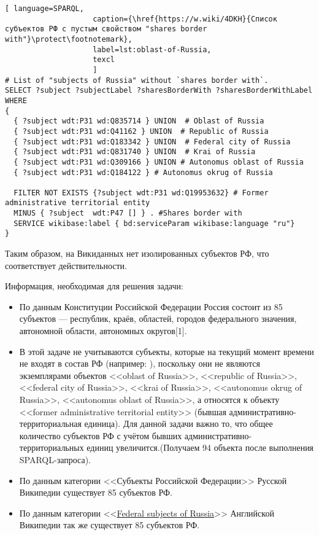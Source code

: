 \begin{lstlisting}[ language=SPARQL, 
                    caption={\href{https://w.wiki/4DKH}{Список субъектов РФ с пустым свойством "shares border with"}\protect\footnotemark},
                    label=lst:oblast-of-Russia,
                    texcl 
                    ]
# List of "subjects of Russia" without `shares border with`. 
SELECT ?subject ?subjectLabel ?sharesBorderWith ?sharesBorderWithLabel
WHERE
{
  { ?subject wdt:P31 wd:Q835714 } UNION  # Oblast of Russia
  { ?subject wdt:P31 wd:Q41162 } UNION  # Republic of Russia
  { ?subject wdt:P31 wd:Q183342 } UNION  # Federal city of Russia
  { ?subject wdt:P31 wd:Q831740 } UNION  # Krai of Russia
  { ?subject wdt:P31 wd:Q309166 } UNION # Autonomus oblast of Russia
  { ?subject wdt:P31 wd:Q184122 } # Autonomus okrug of Russia
  
  FILTER NOT EXISTS {?subject wdt:P31 wd:Q19953632} # Former administrative territorial entity
  MINUS { ?subject  wdt:P47 [] } . #Shares border with 
  SERVICE wikibase:label { bd:serviceParam wikibase:language "ru"}
}
\end{lstlisting}%

Таким образом, на Викиданных нет изолированных субъектов РФ, что соответствует действительности.

Информация, необходимая для решения задачи:
\begin{itemize}
  \item По данным Конституции Российской Федерации Россия состоит из 85 субъектов — республик, краёв, областей, городов федерального значения, автономной области, автономных округов[1].
  \item В этой задаче не учитываются субъекты, которые на текущий момент времени не входят в состав РФ (например: ), поскольку они не являются экземплярами объектов <<oblast of Russia>>, <<republic of Russia>>, <<federal city of Russia>>, <<krai of Russia>>, <<autonomus okrug of Russia>>, <<autonomus oblast of Russia>>, а относятся к объекту <<former administrative territorial entity>> (бывшая административно-территориальная единица). Для данной задачи важно то, что общее количество субъектов РФ с учётом бывших административно-территориальных единиц увеличится.(Получаем 94 объекта после выполнения SPARQL-запроса).
  \item По данным категории <<Субъекты Российской Федерации>> Русской Википедии существует 85 субъектов РФ.
  \item По данным категории <<\href{https://ru.wikipedia.org/wiki/en:Federal_subjects_of_Russia}{Federal subjects of Russia}>> Английской Википедии так же существует 85 субъектов РФ.
\end{itemize}

